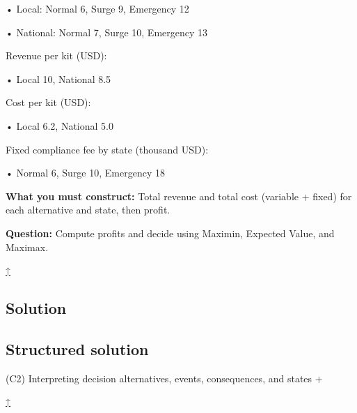 \documentclass[11pt]{article}
\begin{document}
	
	
	• Local: Normal 6, Surge 9, Emergency 12
	
	
	
	• National: Normal 7, Surge 10, Emergency 13
	
	
	
	
	
	Revenue per kit (USD):
	
	
	
	• Local 10, National 8.5
	
	
	
	
	
	Cost per kit (USD):
	
	
	
	• Local 6.2, National 5.0
	
	
	
	
	
	Fixed compliance fee by state (thousand USD):
	
	
	
	• Normal 6, Surge 10, Emergency 18
	
	
	
	
	
	
	\textbf{What you must construct:} Total revenue and total cost (variable + fixed) for each alternative and state, then profit.
	
	
	
	
	
	
	\textbf{Question:} Compute profits and decide using Maximin, Expected Value, and Maximax.
	
	\hyperref[problem7-criteria]{↑}
	
	\subsection*{Solution}
	
	\label{problem7-solution}\label{problem7-criteria}
	
	\subsection*{Structured solution}
	
	
	
	
	
	(C2) Interpreting decision alternatives, events, consequences, and states
	+
	
	
	
	
	
	\hyperref[problem7-criteria]{↑}
	
	
	
\end{document}
